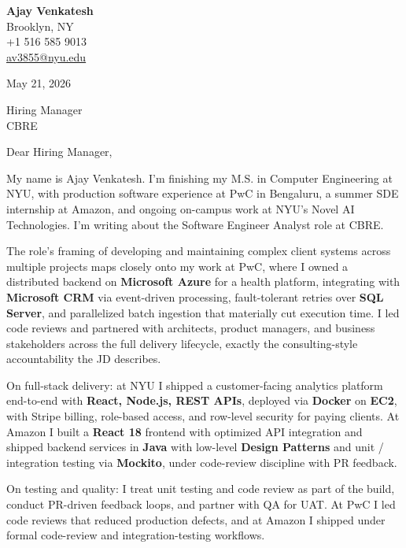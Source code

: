 \documentclass[letterpaper,11pt]{article}
\begin{document}
\begin{flushleft}
\textbf{\large Ajay Venkatesh} \\
Brooklyn, NY \\
+1 516 585 9013 \\
\href{mailto:av3855@nyu.edu}{av3855@nyu.edu}
\end{flushleft}
\vspace{10pt}
May 21, 2026
\vspace{6pt}

Hiring Manager \\
CBRE

\vspace{10pt}

Dear Hiring Manager,

My name is Ajay Venkatesh. I'm finishing my M.S. in Computer Engineering at NYU, with production software experience at PwC in Bengaluru, a summer SDE internship at Amazon, and ongoing on-campus work at NYU's Novel AI Technologies. I'm writing about the Software Engineer Analyst role at CBRE.

The role's framing of developing and maintaining complex client systems across multiple projects maps closely onto my work at PwC, where I owned a distributed backend on \textbf{Microsoft Azure} for a health platform, integrating with \textbf{Microsoft CRM} via event-driven processing, fault-tolerant retries over \textbf{SQL Server}, and parallelized batch ingestion that materially cut execution time. I led code reviews and partnered with architects, product managers, and business stakeholders across the full delivery lifecycle, exactly the consulting-style accountability the JD describes.

On full-stack delivery: at NYU I shipped a customer-facing analytics platform end-to-end with \textbf{React, Node.js, REST APIs}, deployed via \textbf{Docker} on \textbf{EC2}, with Stripe billing, role-based access, and row-level security for paying clients. At Amazon I built a \textbf{React 18} frontend with optimized API integration and shipped backend services in \textbf{Java} with low-level \textbf{Design Patterns} and unit / integration testing via \textbf{Mockito}, under code-review discipline with PR feedback.

On testing and quality: I treat unit testing and code review as part of the build, conduct PR-driven feedback loops, and partner with QA for UAT. At PwC I led code reviews that reduced production defects, and at Amazon I shipped under formal code-review and integration-testing workflows.
\end{document}
